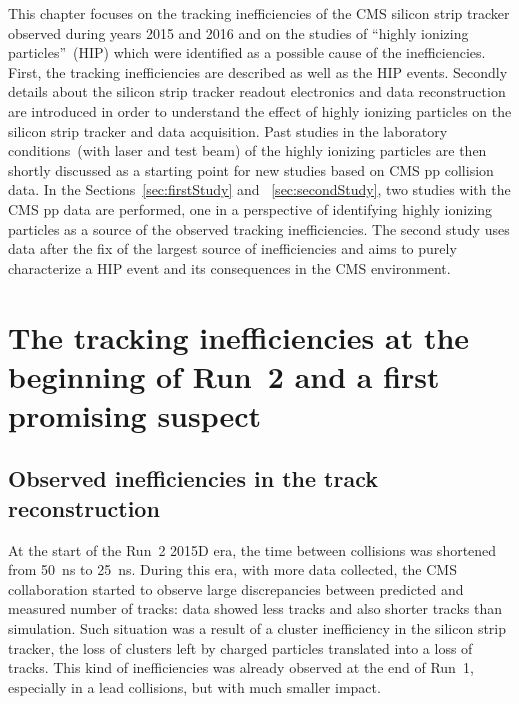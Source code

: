 
\clearpage

\setcounter{secnumdepth}{4}
\setcounter{secnumdepth}{4}

This chapter focuses on the tracking inefficiencies of the CMS silicon strip tracker observed during years 2015 and 2016 and  on the studies of ``highly ionizing particles''~(HIP) which were identified as a possible cause of the inefficiencies. First, the tracking inefficiencies are described as well as the HIP events. Secondly details about the silicon strip tracker readout electronics and data reconstruction are introduced in order to understand the effect of highly ionizing particles on the silicon strip tracker and data acquisition. Past studies in the laboratory conditions~(with laser and test beam) of the highly ionizing particles are then shortly discussed as a starting point for new studies based on CMS pp collision data. In the Sections~\ref{sec:firstStudy} and ~\ref{sec:secondStudy}, two studies with the CMS pp data are performed, one in a perspective of identifying highly ionizing particles as a source of the observed tracking inefficiencies. The second study uses data after the fix of the largest source of inefficiencies and aims to purely characterize a HIP event and its consequences in the CMS environment.

\section{The tracking inefficiencies at the beginning of Run~2 and a first promising suspect~\label{sec:hitIneff}}

\subsection{Observed inefficiencies in the track reconstruction}

At the start of the Run~2 2015D era, the time between collisions was shortened from 50~ns to 25~ns. During this era, with more data collected, the CMS collaboration started to observe large discrepancies between predicted and measured number of tracks: data showed less tracks and also shorter tracks than simulation. Such situation was a result of a cluster inefficiency in the silicon strip tracker, the loss of clusters left by charged particles translated into a loss of tracks. This kind of inefficiencies was already observed at the end of Run~1, especially in a lead collisions, but with much smaller impact. 

